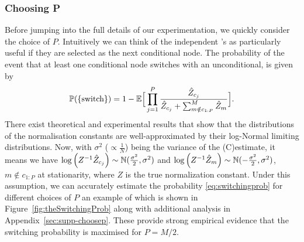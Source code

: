

\subsubsection{Choosing P}
\label{sec:choosingP}
Before jumping into the full details of our experimentation, we quickly consider the choice of $P$. Intuitively we can think of the independent \smc's as particularly useful if they are selected as the next conditional node. The probability of the event %
that at least one conditional node switches with an unconditional, is given by
\begin{align}
\label{eq:switchingprob}
\mathbb{P}(\{\text{switch}\}) 
= 1 - \mathbb{E}\Big[\prod_{j=1}^P \frac{\hat Z_{c_j}}{\hat Z_{c_j} +\sum_{m \notin c_{1:P}}^M \hat Z_{m}}\Big].
\end{align}
There exist theoretical and experimental results \citep{pitt2012some,berard2014lognormal,doucet2015efficient} that show that the distributions of the normalisation constants are well-approximated by their log-Normal limiting distributions. Now, with $\sigma^2$ ($\propto \frac{1}{N}$) being the variance of the (C)\smc estimate, it means we have $\log \left(Z^{-1} \hat Z_{c_j} \right) \sim \mathbb{N}(\frac{\sigma^2}{2},\sigma^2)$ and $\log \left(Z^{-1} \hat Z_{m} \right) \sim \mathbb{N}(-\frac{\sigma^2}{2},\sigma^2)$, $m\notin c_{1:P}$ at stationarity, where $Z$ is the true normalization constant. Under this assumption, we can accurately estimate the probability \eqref{eq:switchingprob} for different choices of $P$ an example of which is shown in Figure~\ref{fig:theSwitchingProb} along with additional analysis in Appendix~\ref{sec:supp-choosep}. These provide strong empirical evidence that the switching probability is maximised for $P=M/2$.

